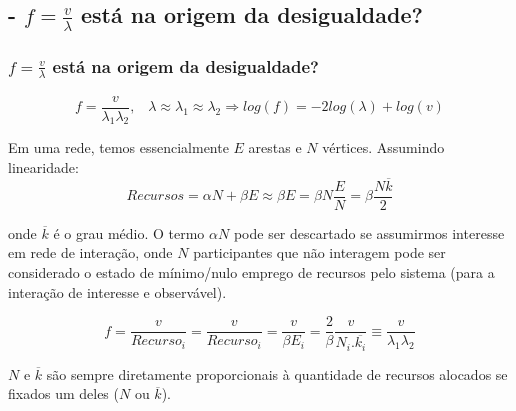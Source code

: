 \documentclass[10pt]{beamer}
\begin{document}





\subsection{- $f=\frac{v}{\lambda}$ está na origem da desigualdade?}
\begin{frame}
\frametitle{$f=\frac{v}{\lambda}$ está na origem da desigualdade?}
\begin{equation}
	f=\frac{v}{\lambda_1 \lambda_2},\;\;\; \lambda \approx \lambda_1 \approx \lambda_2 \Rightarrow log(f) = -2log(\lambda) + log(v)
\end{equation}

Em uma rede, temos essencialmente $E$ arestas e $N$ vértices.
Assumindo linearidade:
\begin{equation}
	Recursos=\alpha N + \beta E \approx \beta E = \beta N \frac{E}{N} = \beta \frac{N \overline{k}}{2}
\end{equation}

onde $\overline{k}$ é o grau médio. O termo $\alpha N$ pode ser descartado se assumirmos interesse em rede de interação, onde $N$ participantes que não interagem pode ser considerado o estado de mínimo/nulo emprego de recursos pelo sistema (para a interação de interesse e observável).

\begin{equation}
	f=\frac{v}{Recurso_i}=\frac{v}{Recurso_i}=\frac{v}{\beta E_i}=\frac{2}{\beta}\frac{v}{N_i . \overline{k_i}} \equiv \frac{v}{\lambda_1 \lambda_2}
\end{equation}

$N$ e $\overline{k}$ são sempre diretamente proporcionais à quantidade de recursos alocados se fixados um deles ($N$ ou $\overline{k}$).

\end{frame}
\end{document}
